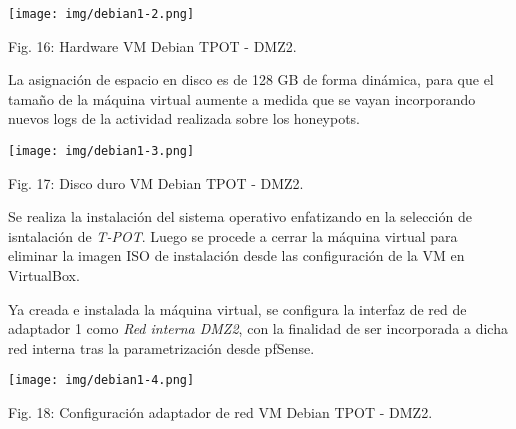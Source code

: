 \documentclass[12pt,oneside,a4paper]{book}
\begin{document}
\vspace{2em}

\begin{center}
    \texttt{[image: img/debian1-2.png]}
    
\vspace{0.1em}
    
    Fig. 16: Hardware VM Debian TPOT - DMZ2.
\end{center}

\vspace{2em}

\hspace{20pt}
La asignación de espacio en disco es de 128 GB de forma dinámica, para que el tamaño de la máquina virtual aumente a medida que se vayan incorporando nuevos logs de la actividad realizada sobre los honeypots.

\vspace{2em}

\begin{center}
    \texttt{[image: img/debian1-3.png]}
    
\vspace{0.1em}
    
    Fig. 17: Disco duro VM Debian TPOT - DMZ2.
\end{center}

\vspace{2em}

\hspace{20pt}
Se realiza la instalación del sistema operativo enfatizando en la selección de isntalación de \textit{T-POT}. Luego se procede a cerrar la máquina virtual para eliminar la imagen ISO de instalación desde las configuración de la VM en VirtualBox.

\vspace{1em}

\hspace{20pt}
Ya creada e instalada la máquina virtual, se configura la interfaz de red de adaptador 1 como \textit{Red interna DMZ2}, con la finalidad de ser incorporada a dicha red interna tras la parametrización desde pfSense.

\vspace{2em}

\begin{center}
    \texttt{[image: img/debian1-4.png]}
    
\vspace{0.1em}
    
    Fig. 18: Configuración adaptador de red VM Debian TPOT - DMZ2.
\end{center}
\end{document}
